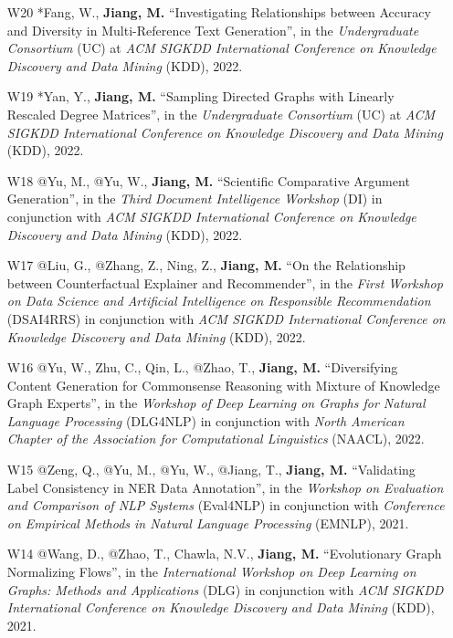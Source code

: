 \documentclass[10pt]{article}
\newenvironment{myindentpar}[1]%
{\begin{list}{}%
         {\setlength{\leftmargin}{#1}}%
         \item[]%
}
{\end{list}}
\newcounter{list}
\begin{document}
\begin{myindentpar}{0.00cm}
\begin{enumerate}[leftmargin=.5cm]
\item[W20] *Fang, W., \textbf{Jiang, M.} ``Investigating Relationships between Accuracy and Diversity in Multi-Reference Text Generation'', in the \textit{Undergraduate Consortium} (UC) at \textit{ACM SIGKDD International Conference on Knowledge Discovery and Data Mining} (KDD), 2022.

\item[W19] *Yan, Y., \textbf{Jiang, M.} ``Sampling Directed Graphs with Linearly Rescaled Degree Matrices'', in the \textit{Undergraduate Consortium} (UC) at \textit{ACM SIGKDD International Conference on Knowledge Discovery and Data Mining} (KDD), 2022.

\item[W18] @Yu, M., @Yu, W., \textbf{Jiang, M.} ``Scientific Comparative Argument Generation'', in the \textit{Third Document Intelligence Workshop} (DI) in conjunction with \textit{ACM SIGKDD International Conference on Knowledge Discovery and Data Mining} (KDD), 2022.

\item[W17] @Liu, G., @Zhang, Z., Ning, Z., \textbf{Jiang, M.} ``On the Relationship between Counterfactual Explainer and Recommender'', in the \textit{First Workshop on Data Science and Artificial Intelligence on Responsible Recommendation} (DSAI4RRS) in conjunction with \textit{ACM SIGKDD International Conference on Knowledge Discovery and Data Mining} (KDD), 2022.

\item[W16] @Yu, W., Zhu, C., Qin, L., @Zhao, T., \textbf{Jiang, M.} ``Diversifying Content Generation for Commonsense Reasoning with Mixture of Knowledge Graph Experts'', in the \textit{Workshop of Deep Learning on Graphs for Natural Language Processing} (DLG4NLP) in conjunction with \textit{North American Chapter of the Association for Computational Linguistics} (NAACL), 2022.
		
\item[W15] @Zeng, Q., @Yu, M., @Yu, W., @Jiang, T., \textbf{Jiang, M.} ``Validating Label Consistency in NER Data Annotation'', in the \textit{Workshop on Evaluation and Comparison of NLP Systems} (Eval4NLP) in conjunction with \textit{Conference on Empirical Methods in Natural Language Processing} (EMNLP), 2021.

\item[W14] @Wang, D., @Zhao, T., Chawla, N.V., \textbf{Jiang, M.} ``Evolutionary Graph Normalizing Flows'', in the \textit{International Workshop on Deep Learning on Graphs: Methods and Applications} (DLG) in conjunction with \textit{ACM SIGKDD International Conference on Knowledge Discovery and Data Mining} (KDD), 2021.


\end{enumerate}
\end{myindentpar}
\end{document}
